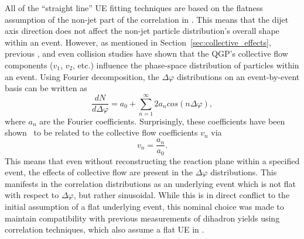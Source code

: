 All of the ``straight line'' UE fitting techniques are based on the flatness assumption of the non-jet part of the correlation in \dphi. This means that the dijet axis direction does not affect the non-jet particle distribution's overall shape within an event. However, as mentioned in Section~\ref{sec:collective_effects}, previous \PbPb, \pPb and even \pp collision studies have shown that the QGP's collective flow components ($v_{1}$, $v_{2}$, etc.) influence the phase-space distribution of particles within an event. Using Fourier decomposition, the $\Delta\varphi$ distributions on an event-by-event basis can be written as
%
\begin{equation}
    \label{eq:dphi_fourier_decomposition}
    \frac{dN}{d\Delta\varphi} = a_{0} + \sum_{n=1}^{\infty}2a_{n}cos(n\Delta\varphi),
\end{equation}
%
where $a_{n}$ are the Fourier coefficients. Surprisingly, these coefficients have been shown~\cite{Justin108, Justin109, Justin110} to be related to the collective flow coefficients $v_{n}$ via
%
\begin{equation}
    \label{eq:fourier_vn_relation}
    v_{n} = \frac{a_{n}}{a_{0}}.
\end{equation}
%
This means that even without reconstructing the reaction plane within a specified event, the effects of collective flow are present in the $\Delta\varphi$ distributions. This manifests in the correlation distributions as an underlying event which is not flat with respect to $\Delta\varphi$, but rather sinusoidal. While this is in direct conflict to the initial assumption of a flat underlying event, this nominal choice was made to maintain compatibility with previous measurements of dihadron yields using correlation techniques, which also assume a flat UE in \dphi.

